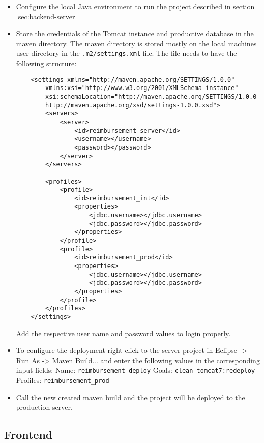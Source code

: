 \begin{itemize}
    \item Configure the local Java environment to run the project described in section \ref{sec:backend-server} 
    \item Store the credentials of the Tomcat instance and productive database in the maven directory. The maven directory is stored mostly on the local machines user directory in the \texttt{.m2/settings.xml} file. The file needs to have the following structure:

    \begin{lstlisting}
    <settings xmlns="http://maven.apache.org/SETTINGS/1.0.0"
        xmlns:xsi="http://www.w3.org/2001/XMLSchema-instance"
        xsi:schemaLocation="http://maven.apache.org/SETTINGS/1.0.0
        http://maven.apache.org/xsd/settings-1.0.0.xsd">
    	<servers>
    		<server>
    			<id>reimbursement-server</id>
    			<username></username>
    			<password></password>
    		</server>
    	</servers>
    
    	<profiles>
    		<profile>
    			<id>reimbursement_int</id>
    			<properties>
    				<jdbc.username></jdbc.username>
    				<jdbc.password></jdbc.password>
    			</properties>
    		</profile>
    		<profile>
    			<id>reimbursement_prod</id>
    			<properties>
    				<jdbc.username></jdbc.username>
    				<jdbc.password></jdbc.password>
    			</properties>
    		</profile>
    	</profiles>
    </settings>
    \end{lstlisting}
    
    Add the respective user name and password values to login properly.
    
    \item To configure the deployment right click to the server project in Eclipse -> Run As -> Maven Build... and enter the following values in the corresponding input fields:
    \newline
    Name: \texttt{reimbursement-deploy}
    \newline
    Goals: \texttt{clean tomcat7:redeploy}
    \newline
    Profiles: \texttt{reimbursement\_prod}
    \item Call the new created maven build and the project will be deployed to the production server.  
    
\end{itemize}
    
\subsection{Frontend}

